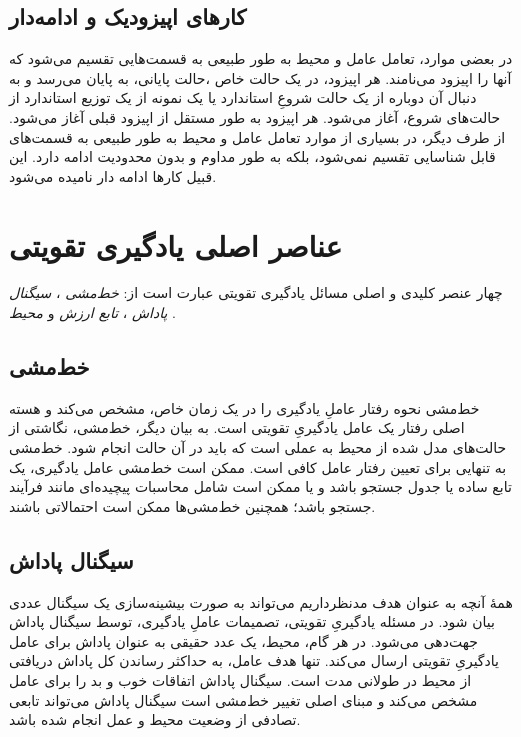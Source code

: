 \subsection{کارهای اپیزودیک و ادامه‌دار}
در بعضی موارد، تعامل عامل و محیط به طور طبیعی به قسمت‌هایی تقسیم می‌شود که آنها را اپیزود می‌نامند. هر اپیزود، در یک حالت خاص ،حالت پایانی، به پایان می‌رسد و به دنبال آن دوباره از یک حالت شروعِ استاندارد یا یک نمونه از یک توزیع استاندارد از حالت‌های شروع، آغاز می‌شود. هر اپیزود به طور مستقل از اپیزود قبلی آغاز می‌شود.
از طرف دیگر، در بسیاری از موارد تعامل عامل و محیط به طور طبیعی به قسمت‌های قابل شناسایی تقسیم نمی‌شود، بلکه به طور مداوم و بدون محدودیت ادامه دارد. این قبیل کارها ادامه دار نامیده می‌شود.


\section{عناصر اصلی یادگیری تقویتی}
چهار عنصر کلیدی و اصلی مسائل یادگیری تقویتی عبارت است از:
\textit{خط‌مشی} ، 
\textit{سیگنال پاداش} ،
\textit{تابع ارزش}  
و
\textit{محیط} .
\subsection{خط‌مشی}
خط‌مشی نحوه رفتار عاملِ یادگیری را در یک زمان خاص، مشخص می‌کند و هسته اصلی رفتار یک عامل یادگیریِ تقویتی است. به بیان دیگر، خط‌مشی، نگاشتی از حالت‌های مدل شده از محیط به عملی است که باید در آن حالت انجام شود. خط‌مشی به تنهایی برای تعیین رفتار عامل کافی است. ممکن است
خط‌مشی عامل یادگیری، یک تابع ساده یا جدول جستجو باشد و یا ممکن است شامل محاسبات پیچیده‌ای مانند فرآیند جستجو باشد؛ همچنین
خط‌مشی‌ها ممکن است احتمالاتی باشند.


\subsection{سیگنال پاداش}

همهٔ آنچه به عنوان هدف مدنظرداریم می‌تواند به صورت بیشینه‌سازی  یک سیگنال عددی بیان شود. در مسئله یادگیریِ تقویتی، تصمیمات عاملِ یادگیری، توسط سیگنال پاداش جهت‌دهی می‌شود. در هر گام، محیط، یک عدد حقیقی به عنوان پاداش برای عامل یادگیریِ تقویتی ارسال می‌کند. تنها هدف عامل، به حداکثر رساندن کل پاداش دریافتی از محیط در طولانی مدت است. سیگنال پاداش اتفاقات خوب و بد را برای عامل مشخص می‌کند و مبنای اصلی تغییر خط‌مشی است
سیگنال پاداش می‌تواند تابعی تصادفی از وضعیت محیط و عمل انجام شده باشد.

